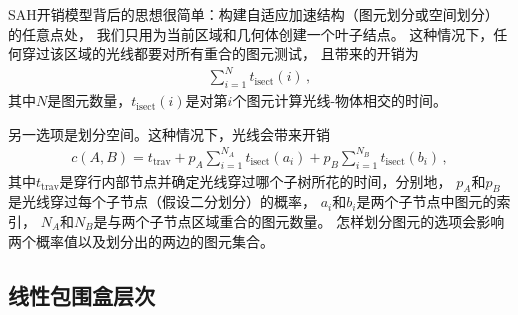 SAH开销模型背后的思想很简单：构建自适应加速结构（图元划分或空间划分）的任意点处，
我们只用为当前区域和几何体创建一个叶子结点。
这种情况下，任何穿过该区域的光线都要对所有重合的图元测试，
且带来的开销为
\begin{align*}
    \sum\limits_{i=1}^{N}{t_{\mathrm{isect}}(i)}\, ,
\end{align*}
其中$N$是图元数量，$t_{\mathrm{isect}}(i)$是对第$i$个图元计算光线-物体相交的时间。

另一选项是划分空间。这种情况下，光线会带来开销
\begin{align}\label{eq:4.1}
    c(A,B)=t_{\mathrm{trav}}+p_A\sum\limits_{i=1}^{N_A}{t_\mathrm{isect}(a_i)}+p_B\sum\limits_{i=1}^{N_B}{t_{\mathrm{isect}}(b_i)}\, ,
\end{align}
其中$t_{\mathrm{trav}}$是穿行内部节点并确定光线穿过哪个子树所花的时间，分别地，
$p_A$和$p_B$是光线穿过每个子节点（假设二分划分）的概率，
$a_i$和$b_i$是两个子节点中图元的索引，
$N_A$和$N_B$是与两个子节点区域重合的图元数量。
怎样划分图元的选项会影响两个概率值以及划分出的两边的图元集合。
\subsection{线性包围盒层次}\label{sub:线性包围盒层次}